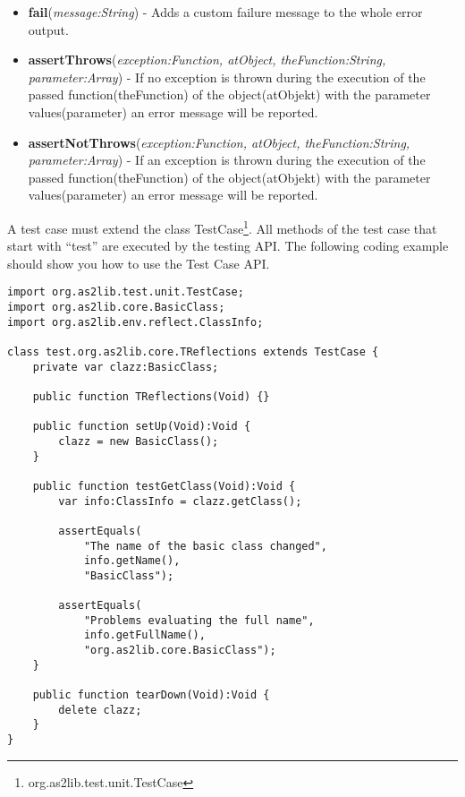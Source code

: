 \begin{itemize}
	\item \textbf{fail}(\textit{message:String}) - Adds a custom failure message to the whole error output.
	\item \textbf{assertThrows}(\textit{exception:Function, atObject, theFunction:String, parameter:Array}) - If no exception is thrown during the execution of the passed function(theFunction) of the object(atObjekt) with the parameter values(parameter) an error message will be reported.
	\item \textbf{assertNotThrows}(\textit{exception:Function, atObject, theFunction:String, parameter:Array}) - If an exception is thrown during the execution of the passed function(theFunction) of the object(atObjekt) with the parameter values(parameter) an error message will be reported.
\end{itemize}

A test case must extend the class TestCase\footnote{org.as2lib.test.unit.TestCase}. All methods of the test case that start with ``test'' are executed by the testing API. The following coding example should show you how to use the Test Case API.
\begin{lstlisting}[frame=single]
import org.as2lib.test.unit.TestCase;
import org.as2lib.core.BasicClass;
import org.as2lib.env.reflect.ClassInfo;

class test.org.as2lib.core.TReflections extends TestCase {
	private var clazz:BasicClass;
	
	public function TReflections(Void) {}
	
	public function setUp(Void):Void {
		clazz = new BasicClass();
	}
	
	public function testGetClass(Void):Void {
		var info:ClassInfo = clazz.getClass();
		
		assertEquals(
			"The name of the basic class changed",
			info.getName(),
			"BasicClass");
		
		assertEquals(
			"Problems evaluating the full name",
			info.getFullName(),
			"org.as2lib.core.BasicClass");
	}
	
	public function tearDown(Void):Void {
		delete clazz;
	}
}
\end{lstlisting}

